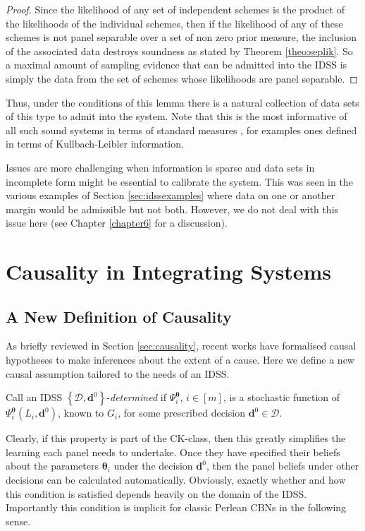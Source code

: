 \begin{proof}
Since the likelihood of any set of independent schemes is the product of the likelihoods of the individual schemes, then if the likelihood of any of these schemes is not panel separable over a set of non zero prior measure, the inclusion of the associated data destroys soundness as stated by Theorem \ref{theo:seplik}. So a maximal amount of sampling evidence that can be admitted into the IDSS is simply the data from the set of schemes whose likelihoods are panel separable.
\end{proof}

Thus, under the conditions of this lemma there is a natural collection of data sets of this type to admit into the system. Note that this is the most informative of all such sound systems in terms of standard measures  \citep{O'Hagan2004a}, for examples ones defined in terms of Kullbach-Leibler information.

Issues are more challenging when information is sparse and data sets in incomplete form might be essential to calibrate the system. This was seen in the various examples of Section \ref{sec:idssexamples} where data on one or another margin would be admissible but not both. However, we do not deal with this issue here (see Chapter \ref{chapter6} for a discussion). 

\section{Causality in Integrating Systems}
\label{sec:idsscaus}
\subsection{A New Definition of Causality}
As briefly reviewed in Section \ref{sec:causality}, recent works have formalised causal hypotheses to make inferences about the extent of a cause. Here we define a new causal assumption tailored to the needs of an IDSS.

\begin{definition}
Call an IDSS $\left\{ \bm{\mathcal{D}},\bm{d}^{0}\right\}$-\emph{determined} if $\Psi^{\bm{\theta}}_i$, $i\in[m]$, is a stochastic function of $\Psi_i^{\bm{\theta}}(L_i,\bm{d}^0)$, known to $G_i$, for some prescribed decision $\bm{d}^0\in\bm{\mathcal{D}}$.
\end{definition}

Clearly, if this property is part of the CK-class, then this greatly simplifies the learning each panel needs to undertake. Once they have specified their beliefs about the parameters $\bm{\theta} _{i}$ under the decision $\bm{d}^0$, then the panel beliefs under other decisions can be calculated automatically. Obviously, exactly whether and how this condition is satisfied depends heavily on the domain of the IDSS. Importantly this condition is implicit for classic Perlean CBNs in the following sense.

